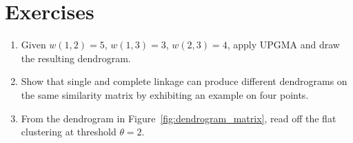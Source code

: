 \section{Exercises}

\begin{enumerate}
  \item Given $w(1,2)=5$, $w(1,3)=3$, $w(2,3)=4$, apply UPGMA and draw the resulting dendrogram.
  \item Show that single and complete linkage can produce different dendrograms on the same similarity matrix by exhibiting an example on four points.
  \item From the dendrogram in Figure~\ref{fig:dendrogram_matrix}, read off the flat clustering at threshold $\theta = 2$.
\end{enumerate}
